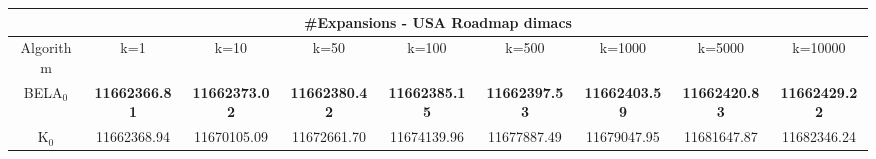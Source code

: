 \begin{tabular}{c|cccccccc}\toprule
\multicolumn{9}{c}{#Expansions - USA Roadmap dimacs}\\ \midrule
Algorithm & k=1 & k=10 & k=50 & k=100 & k=500 & k=1000 & k=5000 & k=10000 \\ \midrule
BELA$_0$ & \textbf{11662366.81} & \textbf{11662373.02} & \textbf{11662380.42} & \textbf{11662385.15} & \textbf{11662397.53} & \textbf{11662403.59} & \textbf{11662420.83} & \textbf{11662429.22} \\
K$_0$ & 11662368.94 & 11670105.09 & 11672661.70 & 11674139.96 & 11677887.49 & 11679047.95 & 11681647.87 & 11682346.24 \\ \bottomrule 
\end{tabular}
